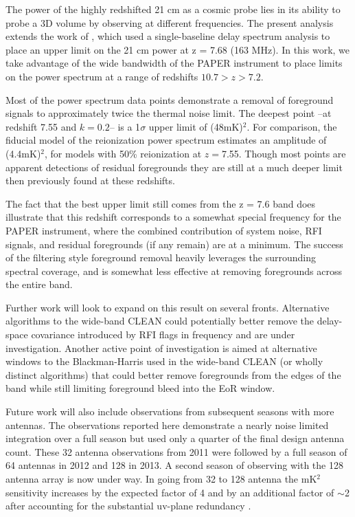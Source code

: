 \documentclass{aastex}
\begin{document}
The power of the highly redshifted 21 cm as a cosmic probe lies in its ability to probe a 3D volume by observing at different frequencies.  The present analysis extends the work of  \cite{Parsons:2014p10499}, which used a single-baseline delay spectrum analysis to place an upper limit on the 21 cm power at z = 7.68 (163 MHz).  In this work, we take advantage of the wide bandwidth of the PAPER instrument to place limits on the power spectrum at a range of redshifts $10.7>z>7.2$.  

Most of the power spectrum data points demonstrate a removal of foreground signals to approximately twice the thermal noise limit. The deepest point --at redshift 7.55 and $k=0.2$-- is a 1$\sigma$ upper limit of (48mK)$^2$. For comparison, the \citet{Lidz:2008p8251} fiducial model of the reionization power spectrum estimates an amplitude of (4.4mK)$^2$, for models with 50\% reionization at $z=$7.55.  Though most points are apparent detections of residual foregrounds they are still at a much deeper limit then previously found at these redshifts.

The fact that the best upper limit still comes from the z = 7.6 band does illustrate that this redshift corresponds to a somewhat special frequency for the PAPER instrument, where the combined contribution of system noise, RFI signals, and residual foregrounds (if any remain) are at a minimum.  The success of the filtering style foreground removal heavily leverages the surrounding spectral coverage, and is somewhat less effective at removing foregrounds across the entire band. 

Further work will look to expand on this result on several fronts.  Alternative algorithms to the wide-band CLEAN could potentially better remove the delay-space covariance introduced by RFI flags in frequency and are under investigation.  Another active point of investigation is aimed at alternative windows to the Blackman-Harris used in the wide-band CLEAN (or wholly distinct algorithms) that could better remove foregrounds from the edges of the band while still limiting foreground bleed into the EoR window.  

Future work will also include observations from subsequent seasons with more antennas.  The observations reported here demonstrate a nearly noise limited integration over a full season but used only a quarter of the final design antenna count. These  32 antenna observations from 2011 were followed by a full season of 64 antennas in 2012 and 128 in 2013.  A second season of observing with the 128 antenna array is now under way. In going from  32 to 128 antenna the mK$^2$ sensitivity increases by the expected factor of 4 and by an additional factor of $\sim$2 after accounting for the substantial uv-plane redundancy \citep{Parsons:2012p9028}. 
\end{document}
